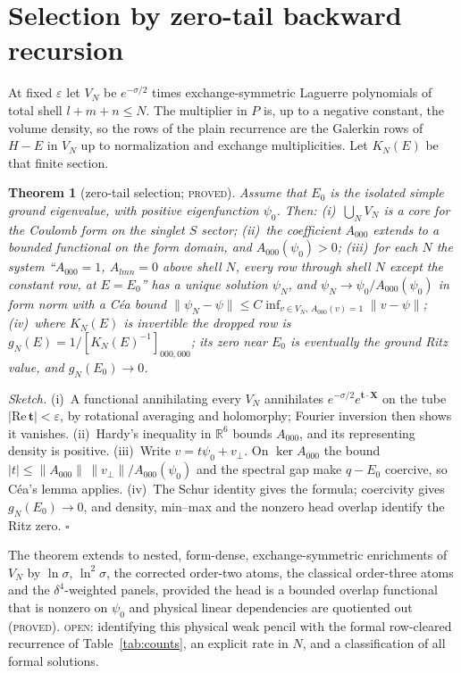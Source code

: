\documentclass[aps,pra,twocolumn,superscriptaddress,nofootinbib]{revtex4-2}
\newtheorem{theorem}{Theorem}
\theoremstyle{remark}
\newcommand{\lab}[1]{\textup{\textsc{#1}}}
\begin{document}
\section{Selection by zero-tail backward recursion}
At fixed $\varepsilon$ let $V_N$ be $e^{-\sigma/2}$ times exchange-symmetric Laguerre polynomials of total shell $l+m+n\le N$.
The multiplier in $P$ is, up to a negative constant, the volume density, so the rows of the plain recurrence are the Galerkin rows of $H-E$ in $V_N$ up to normalization and exchange multiplicities.
Let $K_N(E)$ be that finite section.
\begin{theorem}[zero-tail selection; \lab{proved}]\label{thm:select}
Assume that $E_0$ is the isolated simple ground eigenvalue, with positive eigenfunction $\psi_0$.
Then:
(i)~$\bigcup_NV_N$ is a core for the Coulomb form on the singlet $S$ sector;
(ii)~the coefficient $A_{000}$ extends to a bounded functional on the form domain, and $A_{000}(\psi_0)>0$;
(iii)~for each $N$ the system ``$A_{000}=1$, $A_{lmn}=0$ above shell $N$, every row through shell $N$ except the constant row, at $E=E_0$'' has a unique solution $\psi_N$, and $\psi_N\to\psi_0/A_{000}(\psi_0)$ in form norm with a C\'ea bound
$\|\psi_N-\psi\|\le C\inf_{v\in V_N,\,A_{000}(v)=1}\|v-\psi\|$;
(iv)~where $K_N(E)$ is invertible the dropped row is $g_N(E)=1/[K_N(E)^{-1}]_{000,000}$; its zero near $E_0$ is eventually the ground Ritz value, and $g_N(E_0)\to0$.
\end{theorem}
\noindent
\emph{Sketch.}
(i)~A functional annihilating every $V_N$ annihilates $e^{-\sigma/2}e^{\mathbf t\cdot\mathbf X}$ on the tube $|\mathrm{Re}\,\mathbf t|<\varepsilon$, by rotational averaging and holomorphy; Fourier inversion then shows it vanishes.
(ii)~Hardy's inequality in $\mathbb R^6$ bounds $A_{000}$, and its representing density is positive.
(iii)~Write $v=t\psi_0+v_\perp$.
On $\ker A_{000}$ the bound $|t|\le\|A_{000}\|\,\|v_\perp\|/A_{000}(\psi_0)$ and the spectral gap make $q-E_0$ coercive, so C\'ea's lemma applies.
(iv)~The Schur identity gives the formula; coercivity gives $g_N(E_0)\to0$, and density, min--max and the nonzero head overlap identify the Ritz zero.
$\square$

The theorem extends to nested, form-dense, exchange-symmetric enrichments of $V_N$ by $\ln\sigma$, $\ln^2\sigma$, the corrected order-two atoms, the classical order-three atoms and the $\delta^4$-weighted panels, provided the head is a bounded overlap functional that is nonzero on $\psi_0$ and physical linear dependencies are quotiented out (\lab{proved}).
\lab{open}: identifying this physical weak pencil with the formal row-cleared recurrence of Table~\ref{tab:counts}, an explicit rate in $N$, and a classification of all formal solutions.
\end{document}
